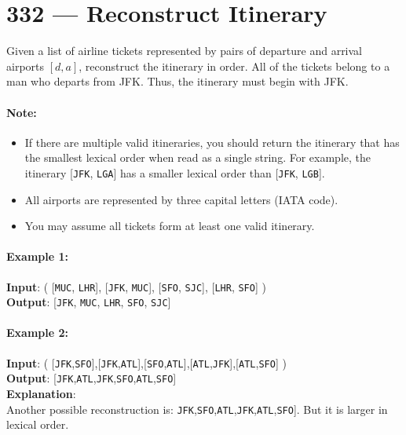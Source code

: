 \section{332 --- Reconstruct Itinerary}
Given a list of airline tickets represented by pairs of departure and arrival airports $[d, a]$, reconstruct the itinerary in order. All of the tickets belong to a man who departs from JFK. Thus, the itinerary must begin with JFK.

\paragraph{Note:}
\begin{itemize}
\item If there are multiple valid itineraries, you should return the itinerary that has the smallest lexical order when read as a single string. For example, the itinerary [\texttt{JFK}, \texttt{LGA}] has a smaller lexical order than [\texttt{JFK}, \texttt{LGB}].
\item All airports are represented by three capital letters (IATA code).
\item You may assume all tickets form at least one valid itinerary.
\end{itemize}

\paragraph{Example 1:}

\begin{flushleft}
\textbf{Input}: ( [\texttt{MUC}, \texttt{LHR}], [\texttt{JFK}, \texttt{MUC}], [\texttt{SFO}, \texttt{SJC}], [\texttt{LHR}, \texttt{SFO}] )
\\
\textbf{Output}: [\texttt{JFK}, \texttt{MUC}, \texttt{LHR}, \texttt{SFO}, \texttt{SJC}]

\end{flushleft}

\paragraph{Example 2:}

\begin{flushleft}
\textbf{Input}: ( [\texttt{JFK},\texttt{SFO}],[\texttt{JFK},\texttt{ATL}],[\texttt{SFO},\texttt{ATL}],[\texttt{ATL},\texttt{JFK}],[\texttt{ATL},\texttt{SFO}] )
\\
\textbf{Output}: [\texttt{JFK},\texttt{ATL},\texttt{JFK},\texttt{SFO},\texttt{ATL},\texttt{SFO}]
\\
\textbf{Explanation}: 
\\
Another possible reconstruction is: \texttt{JFK},\texttt{SFO},\texttt{ATL},\texttt{JFK},\texttt{ATL},\texttt{SFO}]. But it is larger in lexical order.
\end{flushleft}
